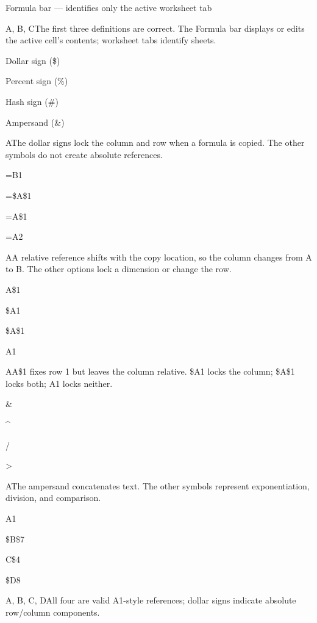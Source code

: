 \begin{enumerate}[label=\textbf{Q\arabic*.}, leftmargin=*]
{   \item Formula bar --- identifies only the active worksheet tab}
  {A, B, C}{The first three definitions are correct. The Formula bar displays or edits the active cell's contents; worksheet tabs identify sheets.}
\fi
\ifnum{}
  {\item Dollar sign (\$)
   \item Percent sign (\%)
   \item Hash sign (\#)
   \item Ampersand (\&)}
  {A}{The dollar signs lock the column and row when a formula is copied. The other symbols do not create absolute references.}
  {\item =B1
   \item =\$A\$1
   \item =A\$1
   \item =A2}
  {A}{A relative reference shifts with the copy location, so the column changes from A to B. The other options lock a dimension or change the row.}
  {\item A\$1
   \item \$A1
   \item \$A\$1
   \item A1}
  {A}{A\$1 fixes row 1 but leaves the column relative. \$A1 locks the column; \$A\$1 locks both; A1 locks neither.}
  {\item \&
   \item \^{}
   \item /
   \item >}
  {A}{The ampersand concatenates text. The other symbols represent exponentiation, division, and comparison.}
  {\item A1
   \item \$B\$7
   \item C\$4
   \item \$D8}
  {A, B, C, D}{All four are valid A1-style references; dollar signs indicate absolute row/column components.}
\fi
\ifnum{}

\end{enumerate}
